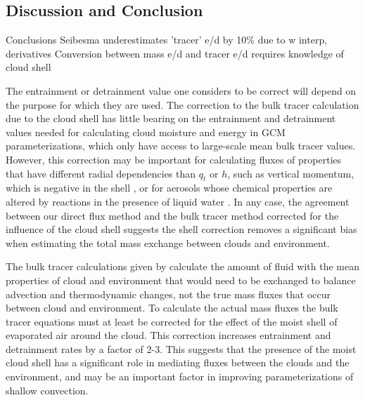 \documentclass[draft,grl]{agutex}
\begin{document}
\begin{article}
\section{Discussion and Conclusion}

Conclusions
Seibesma underestimates 'tracer' e/d by 10\% due to w interp, derivatives
Conversion between mass e/d and tracer e/d requires knowledge of cloud shell

The entrainment or detrainment value one considers to be correct will depend on 
the purpose for which they are used.  The correction to the bulk tracer 
calculation due to the cloud shell has little bearing on the entrainment and 
detrainment values needed for calculating cloud moisture and energy in GCM 
parameterizations, which only have access to large-scale mean bulk tracer 
values.  However, this correction may be important for calculating 
fluxes of properties that have different radial dependencies than $q_t$ or $h$, 
such as vertical momentum, which is negative in the shell \citep{Heus2008}, or 
for aerosols whose chemical properties are altered by reactions in the presence 
of liquid water \citep{Hoppel1994}.  In any case, the agreement between our 
direct flux method and the bulk tracer method corrected for the influence of 
the cloud shell suggests the shell correction removes a significant bias when 
estimating the total mass exchange between clouds and environment.

The bulk tracer calculations given by \cite{Siebesma1995} calculate the amount
of fluid with the mean properties of cloud and environment that would need to
be exchanged to balance advection and thermodynamic changes, not the true mass
fluxes that occur between cloud and environment.  To calculate the actual mass
fluxes the bulk tracer equations must at least be corrected for the effect of
the moist shell of evaporated air around the cloud.  This correction increases
entrainment and detrainment rates by a factor of 2-3.  This suggests that the
presence of the moist cloud shell has a significant role in mediating fluxes
between the clouds and the environment, and may be an important factor in 
improving parameterizations of shallow convection.




\end{article}
\end{document}
